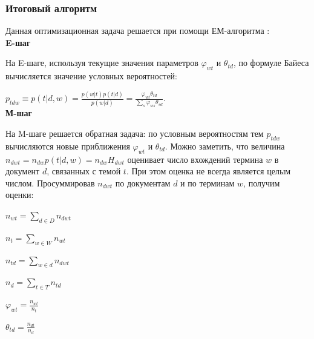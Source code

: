 \documentclass[12pt]{article}
\renewcommand{\phi}{\varphi}
\begin{document}
\subsubsection{Итоговый алгоритм}

Данная оптимизационная задача решается при помощи ЕМ-алгоритма \cite{plsadef2}:\\
\textbf{E-шаг}

На E-шаге, используя текущие значения параметров $\phi_{wt}$ и $\theta_{td}$, по формуле Байеса вычисляется значение условных вероятностей:

$p_{tdw} \equiv p(t|d,w) = \frac {p(w|t)p(t|d)} {p(w|d)} = \frac {\varphi_{wt}\theta_{td}} {\sum_s\varphi_{ws}\theta_{sd}}$.\\
\textbf{М-шаг}

На M-шаге решается обратная задача: по условным вероятностям тем $p_{tdw}$ вычисляются новые приближения $\phi_{wt}$ и $\theta_{td}$.
Можно заметить, что величина $n_{dwt}=n_{dw}p(t|d,w)=n_{dw}H_{dwt}$ оценивает число вхождений термина $w$ в документ $d$, связанных с темой $t$. При этом оценка не всегда является целым числом. Просуммировав $n_{dwt}$ по документам $d$ и по терминам $w$, получим оценки:

$n_{wt}=\sum_{d \in D} n_{dwt}$

$n_t = \sum_{w \in W}n_{wt}$

$n_{td}=\sum_{w \in d} n_{dwt}$

$n_d = \sum_{t \in T}n_{td}$

$\phi_{wt}=\frac{n_{wt}}{n_t}$

$\theta_{td} = \frac{n_{dt}}{n_{d}}$
\end{document}
